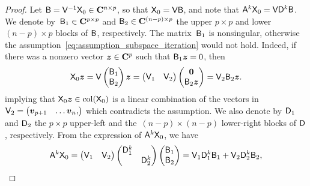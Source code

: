 \begin{proof}
    Let $\mathsf B = \mathsf V^{-1} \mathsf X_0 \in \mathbf C^{n \times p}$, so that $\mathsf X_0 = \mathsf V \mathsf B$,
    and note that $\mathsf A^k \mathsf X_0 = \mathsf V \mathsf D^k \mathsf B$.
    We denote by~$\mathsf B_1 \in \mathbf C^{p \times p}$ and $\mathsf B_2 \in \mathbf C^{(n-p) \times p}$ the upper $p \times p$ and lower $(n-p) \times p$ blocks of $\mathsf B$,
    respectively.
    The matrix~$\mathsf B_1$ is nonsingular,
    otherwise the assumption~\eqref{eq:assumption_subspace_iteration} would not hold.
    Indeed, if there was a nonzero vector $\mathbf{\boldsymbol{z}} \in \mathbf C^p$ such that $\mathsf B_1 \mathbf{\boldsymbol{z}} = 0$,
    then
    \[
        \mathsf X_0
        \mathbf{\boldsymbol{z}}
        = \mathsf V
        \begin{pmatrix}
            \mathsf B_1 \\
            \mathsf B_2
        \end{pmatrix}
        \mathbf{\boldsymbol{z}}
        =
        \begin{pmatrix}
            \mathsf V_1
            & \mathsf V_2
        \end{pmatrix}
        \begin{pmatrix}
            \mathbf{\boldsymbol{0}} \\
            \mathsf B_2 \mathbf{\boldsymbol{z}}
        \end{pmatrix}
        = \mathsf V_2 \mathsf B_2 \mathbf{\boldsymbol{z}}.
    \]
    implying that $\mathsf X_0 \mathbf{\boldsymbol{z}} \in \operatorname{col}(\mathsf X_0)$ is a linear combination of the vectors in $\mathsf V_2 =
    \begin{pmatrix}
        \mathbf{\boldsymbol{v}}_{p+1} & \hdots \mathbf{\boldsymbol{v}}_n,
    \end{pmatrix}$
    which contradicts the assumption.
    We also denote by $\mathsf D_1$ and $\mathsf D_2$ the $p \times p$ upper-left and the~$(n-p) \times (n-p)$ lower-right blocks of $\mathsf D$, respectively.
    From the expression of $\mathsf A^k \mathsf X_0$,
    we have
    \begin{align}
        \notag
        \mat A^k \mat X_0
        &= \begin{pmatrix} \mat V_1 & \mat V_2 \end{pmatrix}
        \begin{pmatrix}
            \mat D_1^k & \\
                       & \mat D_2^k
        \end{pmatrix}
        \begin{pmatrix}
            \mat B_1 \\ \mat B_2
        \end{pmatrix}
        =
        \mat V_1 \mat D_1^k \mat B_1 + \mat V_2 \mat D_2^k \mat B_2, \\

\end{align}
\end{proof}
